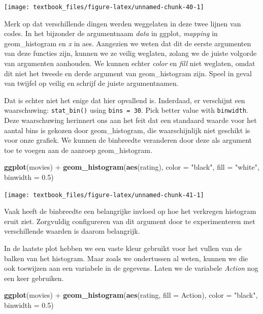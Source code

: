\documentclass[]{tufte-book}
\newenvironment{Shaded}{}{}
\newcommand{\DataTypeTok}[1]{\textcolor[rgb]{0.56,0.13,0.00}{#1}}
\newcommand{\FloatTok}[1]{\textcolor[rgb]{0.25,0.63,0.44}{#1}}
\newcommand{\KeywordTok}[1]{\textcolor[rgb]{0.00,0.44,0.13}{\textbf{#1}}}
\newcommand{\NormalTok}[1]{#1}
\newcommand{\OperatorTok}[1]{\textcolor[rgb]{0.40,0.40,0.40}{#1}}
\newcommand{\StringTok}[1]{\textcolor[rgb]{0.25,0.44,0.63}{#1}}
\begin{document}
\texttt{[image: textbook\_files/figure-latex/unnamed-chunk-40-1]}

Merk op dat verschillende dingen werden weggelaten in deze twee lijnen van codes. In het bijzonder de argumentnaam \emph{data} in ggplot, \emph{mapping} in geom\_histogram en \emph{x} in aes. Aangezien we weten dat dit de eerste argumenten van deze functies zijn, kunnen we ze veilig weglaten, zolang we de juiste volgorde van argumenten aanhouden. We kunnen echter \emph{color} en \emph{fill} niet weglaten, omdat dit niet het tweede en derde argument van geom\_histogram zijn. Speel in geval van twijfel op veilig en schrijf de juiste argumentnamen.

Dat is echter niet het enige dat hier opvallend is. Inderdaad, er verschijnt een waarschuwing: \texttt{stat\_bin()} using \texttt{bins\ =\ 30}. Pick better value with \texttt{binwidth}. Deze waarschuwing herinnert ons aan het feit dat een standaard waarde voor het aantal bins is gekozen door geom\_histogram, die waarschijnlijk niet geschikt is voor onze grafiek. We kunnen de binbreedte veranderen door deze als argument toe te voegen aan de aanroep geom\_histogram.

\begin{Shaded}
\begin{Highlighting}[]
\KeywordTok{ggplot}\NormalTok{(movies) }\OperatorTok{+}
\StringTok{    }\KeywordTok{geom_histogram}\NormalTok{(}\KeywordTok{aes}\NormalTok{(rating), }\DataTypeTok{color =} \StringTok{"black"}\NormalTok{, }\DataTypeTok{fill =} \StringTok{"white"}\NormalTok{, }\DataTypeTok{binwidth =} \FloatTok{0.5}\NormalTok{)}
\end{Highlighting}
\end{Shaded}

\texttt{[image: textbook\_files/figure-latex/unnamed-chunk-41-1]}

Vaak heeft de binbreedte een belangrijke invloed op hoe het verkregen histogram eruit ziet. Zorgvuldig configureren van dit argument door te experimenteren met verschillende waarden is daarom belangrijk.

In de laatste plot hebben we een vaste kleur gebruikt voor het vullen van de balken van het histogram. Maar zoals we ondertussen al weten, kunnen we die ook toewijzen aan een variabele in de gegevens. Laten we de variabele \emph{Action} nog een keer gebruiken.

\begin{Shaded}
\begin{Highlighting}[]
\KeywordTok{ggplot}\NormalTok{(movies) }\OperatorTok{+}
\StringTok{    }\KeywordTok{geom_histogram}\NormalTok{(}\KeywordTok{aes}\NormalTok{(rating, }\DataTypeTok{fill =}\NormalTok{ Action), }\DataTypeTok{color =} \StringTok{"black"}\NormalTok{, }\DataTypeTok{binwidth =} \FloatTok{0.5}\NormalTok{)}
\end{Highlighting}
\end{Shaded}
\end{document}
